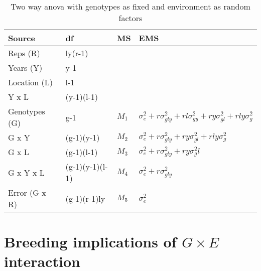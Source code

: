 \documentclass[11pt,dvipsnames,ignorenonframetext,aspectratio=169]{beamer}
\begin{document}
\begin{frame}{}
\protect\hypertarget{section-7}{}
\begin{table}

\caption{\label{tab:anova-mixed}Two way anova with genotypes as fixed and environment as random factors}
\centering
\fontsize{6}{8}\selectfont
\begin{tabular}[t]{llll}
\toprule
Source & df & MS & EMS\\
\midrule
Reps (R) & ly(r-1) &  & \\
Years (Y) & y-1 &  & \\
Location (L) & l-1 &  & \\
Y x L & (y-1)(l-1) &  & \\
Genotypes (G) & g-1 & $M_1$ & $\sigma^2_e + r\sigma^2_{gly} + rl\sigma^2_{gy} + ry\sigma^2_{gl} + rly\sigma^2_g$\\
\addlinespace
G x Y & (g-1)(y-1) & $M_2$ & $\sigma^2_e + r\sigma^2_{gly} + ry\sigma^2_{gl} + rly\sigma^2_g$\\
G x L & (g-1)(l-1) & $M_3$ & $\sigma^2_e + r\sigma^2_{gly} + ry\sigma^2_gl$\\
G x Y x L & (g-1)(y-1)(l-1) & $M_4$ & $\sigma^2_e + r\sigma^2_{gly}$\\
Error (G x R) & (g-1)(r-1)ly & $M_5$ & $\sigma^2_e$\\
\bottomrule
\end{tabular}
\end{table}
\end{frame}

\hypertarget{breeding-implications-of-g-times-e-interaction}{%
\section{\texorpdfstring{Breeding implications of \(G \times E\)
interaction}{Breeding implications of G \textbackslash times E interaction}}\label{breeding-implications-of-g-times-e-interaction}}
\end{document}
